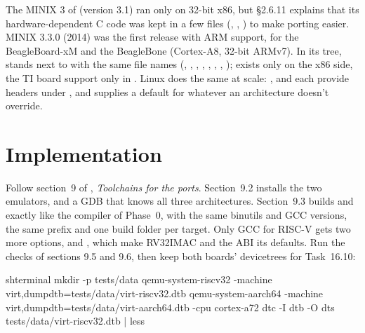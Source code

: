 \documentclass[11pt,a4paper]{article}
\begin{document}
\begin{minixbox}
The MINIX 3 of \OSDI (version 3.1) ran only on 32-bit x86, but \S2.6.11 explains that its hardware-dependent C code
was kept in a few files (, , ) to make porting easier. MINIX 3.3.0
(2014) was the first release with ARM support, for the BeagleBoard-xM and the BeagleBone (Cortex-A8, 32-bit ARMv7).
In its tree,  stands next to  with the same file names
(, , , , , ,
, );  exists only on the x86 side, the TI board support only in
. Linux does the same at scale: ,  and  each provide
headers under , and  supplies a default for whatever an architecture
doesn't override.
\end{minixbox}

\section{Implementation}

Follow section~9 of , \emph{Toolchains for the ports}. Section~9.2 installs the two emulators,
 and a GDB that knows all three architectures. Section~9.3 builds  and 
exactly like the  compiler of Phase~0, with the same binutils and GCC versions, the same prefix and one
build folder per target. Only GCC for RISC-V gets two more  options,
 and , which make RV32IMAC and the  ABI
its defaults. Run the checks of sections 9.5 and 9.6, then keep both boards' devicetrees for Task~16.10:

\begin{lst}{sh}{terminal}
mkdir -p tests/data
qemu-system-riscv32 -machine virt,dumpdtb=tests/data/virt-riscv32.dtb
qemu-system-aarch64 -machine virt,dumpdtb=tests/data/virt-aarch64.dtb -cpu cortex-a72
dtc -I dtb -O dts tests/data/virt-riscv32.dtb | less
\end{lst}
\end{document}
